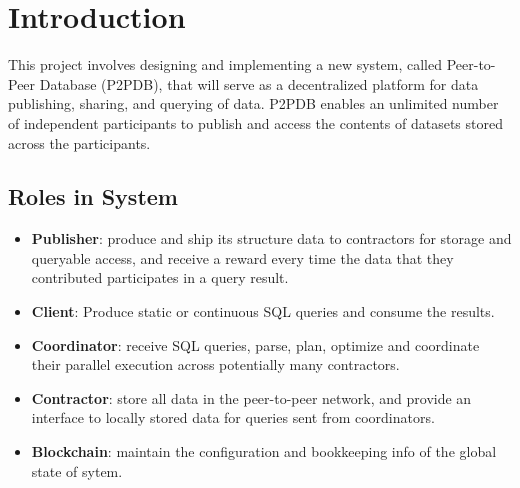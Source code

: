 \documentclass[12pt]{article}
\begin{document}
\begin{center}
	\tableofcontents
\end{center}
\pagebreak
\section{Introduction}
\label{sec:intro}
\normalsize This project involves designing and implementing a new system, called Peer-to-Peer Database (P2PDB), that will serve as a decentralized platform for data publishing, sharing, and querying of data. P2PDB enables an unlimited number of independent participants to publish and access the contents of datasets stored across the participants.

\subsection{Roles in System}

\begin{itemize}
    \item \textbf{Publisher}: produce and ship its structure data to contractors for storage and queryable access, and receive a reward every time the data that they contributed participates in a query result.
    \item \textbf{Client}: Produce static or continuous SQL queries and consume the results.
    \item \textbf{Coordinator}: receive SQL queries, parse, plan, optimize  and coordinate their parallel execution across potentially many contractors.
    \item \textbf{Contractor}: store all data in the peer-to-peer network, and provide an interface to locally stored data for queries sent from coordinators.
    \item \textbf{Blockchain}: maintain the configuration and bookkeeping info of the global state of sytem.    
\end{itemize}
           
\end{document}
